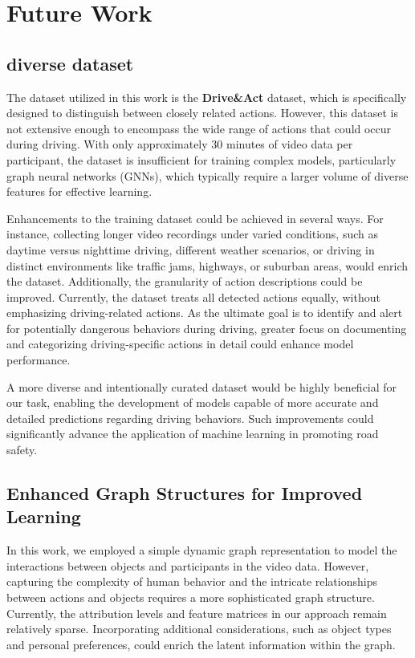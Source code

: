 \chapter{Future Work}\label{chapter:futurework}


\section{diverse dataset}

The dataset utilized in this work is the \textbf{Drive\&Act} dataset, which is specifically designed to distinguish between closely related actions. However, this dataset is not extensive enough to encompass the wide range of actions that could occur during driving. With only approximately 30 minutes of video data per participant, the dataset is insufficient for training complex models, particularly graph neural networks (GNNs), which typically require a larger volume of diverse features for effective learning.

Enhancements to the training dataset could be achieved in several ways. For instance, collecting longer video recordings under varied conditions, such as daytime versus nighttime driving, different weather scenarios, or driving in distinct environments like traffic jams, highways, or suburban areas, would enrich the dataset. Additionally, the granularity of action descriptions could be improved. Currently, the dataset treats all detected actions equally, without emphasizing driving-related actions. As the ultimate goal is to identify and alert for potentially dangerous behaviors during driving, greater focus on documenting and categorizing driving-specific actions in detail could enhance model performance.

A more diverse and intentionally curated dataset would be highly beneficial for our task, enabling the development of models capable of more accurate and detailed predictions regarding driving behaviors. Such improvements could significantly advance the application of machine learning in promoting road safety.

\section{Enhanced Graph Structures for Improved Learning}

In this work, we employed a simple dynamic graph representation to model the interactions between objects and participants in the video data. However, capturing the complexity of human behavior and the intricate relationships between actions and objects requires a more sophisticated graph structure. Currently, the attribution levels and feature matrices in our approach remain relatively sparse. Incorporating additional considerations, such as object types and personal preferences, could enrich the latent information within the graph.

